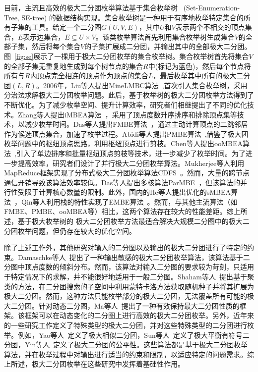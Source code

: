 目前，主流且高效的极大二分团枚举算法基于集合枚举树~\cite{SEtree92} (Set-Enumeration-Tree, SE-tree) 的数据结构实现。集合枚举树是一种用于有序地枚举特定集合的所有子集的工具。给定一个二分图$G(U, V, E)$，其中$U$和$V$表示两个不相交的顶点集合，$E$表示边集合，$E \subseteq U \times V$。该类枚举算法首先利用集合枚举树生成集合$V$的全部子集，然后将每个集合$V$的子集扩展成二分团，并输出其中的全部极大二分团。图~\ref{fig:se}展示了一棵用于极大二分团枚举的集合枚举树。集合枚举树首先将集合$V$的全部子集无重复地生成到每个树节点的集合$R$中(标记为蓝色)，然后每个节点将所有与$R$内顶点完全相连的顶点作为顶点的集合$L$，最后枚举其中所有的极大二分团$(L,R)$。2006年，Liu等人提出MineLMBC算法~\cite{minel06},首次引入集合枚举树，采用分治法求解极大二分团枚举问题。此后，基于枚举树的极大二分团枚举方法得到了不断优化。为了减少枚举空间、提升计算效率，研究者们相继提出了不同的优化技术。Zhang等人提出iMBEA算法~\cite{iMBEA14}，采用了顶点度数升序排序和排除顶点集等技术，以减少枚举时间。Das等人提出FMBE算法~\cite{parMBE18}，通过主动计算顶点的二跳邻居作为候选顶点集合，加速了枚举过程。Abidi等人提出PMBE算法~\cite{PMBE20},借鉴了极大团枚举问题中的枢纽顶点思路，利用枢纽顶点进行剪枝。Chen等人提出ooMBEA算法~\cite{ooMBE22},引入了单边排序和批量枢纽顶点剪枝等技术，进一步减少了枚举时间。为了进一步提高效率，研究者们设计了并行极大二分团枚举算法。Mukherjee等人利用MapReduce框架实现了分布式极大二分团枚举算法CDFS~\cite{mapreduceMBE16}。然而，大量的跨节点通信开销导致该算法效率较低。Das等人提出多核算法ParMBE~\cite{parMBE18}，但该算法的并行性受限于计算核心数量的限制。此外，国内的He等人提出优化的sMBEA算法~\cite{MBEHe18}，Qin等人利用栈的特性实现了EMBE算法~\cite{MBEQin20}。然而，与其他主流算法（如FMBE、PMBE、ooMBEA等）相比，这两个算法存在较大的性能差距。综上所述，基于极大枚举树的
极大二分团枚举方法最适合解决大规模二分图中的极大二分团枚举问题，但仍存在较大的优化空间。

除了上述工作外，其他研究对输入的二分图以及输出的极大二分团进行了特定的约束。Damaschke等人~\cite{Damaschke14}提出了一种输出敏感的极大二分团枚举算法，该算法基于二分图中顶点度数的倾斜分布。然而，该算法对输入二分图的要求较为苛刻，只适用于特定情况下的求解，并不能很好地适用于一般二分图。Shaham等人~\cite{Shaham16}提出基于聚类的方法，在二分团搜索的子空间中利用蒙特卡洛方法获取随机种子并将其扩展为极大二分团。然而，这种方法只能枚举部分的极大二分团，无法覆盖所有可能的极大二分团。针对动态二分图，Ma等人~\cite{Ma22}提出了一种有效保持最大二分团性质的框架。该框架可以在动态变化的二分图上进行高效的极大二分团枚举。另外，近年来的一些研究工作定义了特殊类型的极大二分团，并对这些特殊类型的二分团进行枚举。例如，Yao等人~\cite{SimilarMBE22}定义了极大相似二分团，Sun等人~\cite{Sun22}定义了极大平衡有符号二分团，Yin等人~\cite{FairMBE23}定义了极大二分团的公平性。这些算法都是基于极大二分团枚举算法，并在枚举过程中对输出进行适当的约束和限制，以适应特定的问题需求。综上所述，极大二分团枚举在这些研究中发挥着基础性作用。


